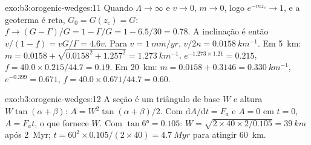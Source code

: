 \begin{solution}{exo:b3:orogenic-wedges:11}
Quando $\Lambda \to \infty$ e $v \to 0$, $m \to 0$, logo $e^{-mz_c} \to 1$, e
a geoterma é reta, $G_0 = G(z_c) = G$: $f \to (G - \Gamma)/G = 1 -
\Gamma/G = 1 - 6.5/30 = 0.78$. A inclinação é então $v/(1 - f) = vG/\Gamma =
4.6v$. Para $v = \qty{1}{mm/yr}$, $v/2\kappa = \qty{0.0158}{km^{-1}}$. Em
\qty{5}{km}: $m = 0.0158 + \sqrt{0.0158^2 + 1.257^2} = \qty{1.273}{km^{-1}}$,
$e^{-1.273\times1.21} = 0.215$, $f = 40.0\times0.215/44.7 = 0.19$. Em
\qty{20}{km}: $m = 0.0158 + 0.3146 = \qty{0.330}{km^{-1}}$, $e^{-0.399} =
0.671$, $f = 40.0\times0.671/44.7 = 0.60$.
\end{solution}

\begin{solution}{exo:b3:orogenic-wedges:12}
A seção é um triângulo de base $W$ e altura $W\tan(\alpha + \beta)$:
$A = W^2\tan(\alpha + \beta)/2$. Com $\mathrm dA/\mathrm dt = F_a$ e $A =
0$ em $t = 0$, $A = F_at$, o que fornece $W$. Com $\tan\ang{6} = 0.105$:
$W = \sqrt{2\times40\times2/0.105} = \qty{39}{km}$ após \qty{2}{Myr}; $t =
60^2\times0.105/(2\times40) = \qty{4.7}{Myr}$ para atingir \qty{60}{km}.
\end{solution}


